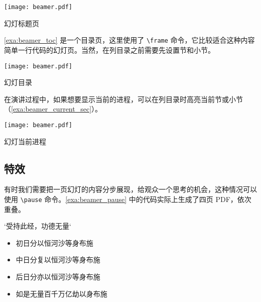 \begin{example}[htbp]
\begin{Demo}
\centering
\texttt{[image: beamer.pdf]}
\end{Demo}
\caption{幻灯标题页}
\label{exa:beamer_titlepage}
\end{example}

\pagebreak
\autoref{exa:beamer_toc} 是一个目录页，这里使用了 \verb|\frame| 命令，它比较适合这种内容简单一行代码的幻灯页。当然，在列目录之前需要先设置节和小节。

\begin{example}[!h]
\begin{FBTDemo}[numbers=none]{
\centering
\texttt{[image: beamer.pdf]}
}
\frame{\tableofcontents}
\end{FBTDemo}
\caption{幻灯目录}
\label{exa:beamer_toc}
\end{example}

在演讲过程中，如果想要显示当前的进程，可以在列目录时高亮当前节或小节（\autoref{exa:beamer_current_sec}）。

\begin{example}[htbp]
\begin{FBTDemo}[numbers=none]{
\centering
\texttt{[image: beamer.pdf]}
}
\frame{\tableofcontents[currentsection]}
\end{FBTDemo}
\caption{幻灯当前进程}
\label{exa:beamer_current_sec}
\end{example}

\subsection{特效}

有时我们需要把一页幻灯的内容分步展现，给观众一个思考的机会，这种情况可以使用 \verb|\pause| 命令。\autoref{exa:beamer_pause} 中的代码实际上生成了四页 PDF，依次重叠。

\begin{Code}[]
\begin{frame}{`受持此经，功德无量`}
\begin{itemize}
  \item 初日分以恒河沙等身布施
  \pause
  \item 中日分复以恒河沙等身布施
  \pause
  \item 后日分亦以恒河沙等身布施
  \pause
  \item 如是无量百千万亿劫以身布施
\end{itemize}
\end{frame}
\end{Code}

